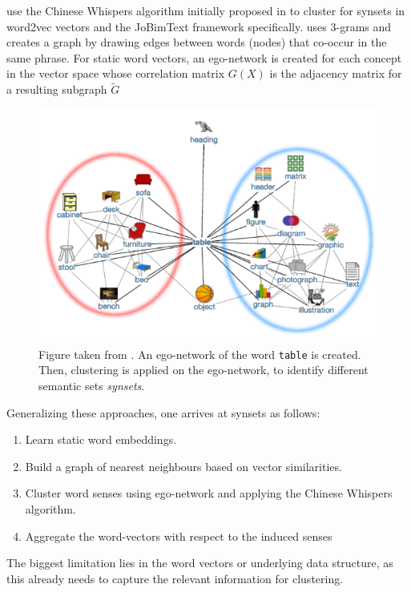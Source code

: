 \documentclass[a4paper,12pt,oneside,openright]{report}
\begin{document}
\cite{pelevina16, biemann13} use the Chinese Whispers algorithm initially proposed in \cite{biemann06} to cluster for synsets in word2vec vectors and the JoBimText framework \cite{biemann13} specifically.
\cite{denkowski09} uses 3-grams and creates a graph by drawing edges between words (nodes) that co-occur in the same phrase.
For static word vectors, an ego-network is created for each concept in the vector space whose correlation matrix $G(X)$ is the adjacency matrix for a resulting subgraph $\tilde{G}$

\begin{figure}[h]
	\center
  \includegraphics[width=0.6\linewidth]{./assets/relatedwork/ego_network.png}
  \caption{Figure taken from \cite{pelevina16}. An ego-network of the word \texttt{table} is created. Then, clustering is applied on the ego-network, to identify different semantic sets \textit{synsets}.}
  \label{fig:ego_network}
\end{figure}

Generalizing these approaches, one arrives at synsets as follows: 

\begin{enumerate}
\item Learn static word embeddings.
\item Build a graph of nearest neighbours based on vector similarities.
\item Cluster word senses using ego-network and applying the Chinese Whispers algorithm.
\item Aggregate the word-vectors with respect to the induced senses
\end{enumerate}

The biggest limitation lies in the word vectors or underlying data structure, as this already needs to capture the relevant information for clustering. \\
\end{document}
